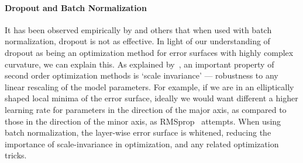 \documentclass[thesis]{subfiles}
\begin{document}
\paragraph{Dropout and Batch Normalization}
It has been observed empirically by \citet{Ioffe2015} and others that when used with batch normalization, dropout is not as effective. In light of our understanding of dropout as being an optimization method for error surfaces with highly complex curvature, we can explain this. As explained by~\citep{martens2010deep}, an important property of second order optimization methods is `scale invariance' --- robustness to any linear rescaling of the model parameters. For example, if we are in an elliptically shaped local minima of the error surface, ideally we would want different a higher learning rate for parameters in the direction of the major axis, as compared to those in the direction of the minor axis, as RMSprop~\citep{rmsprop} attempts. When using batch normalization, the layer-wise error surface is whitened, reducing the importance of scale-invariance in optimization, and any related optimization tricks.
\end{document}
